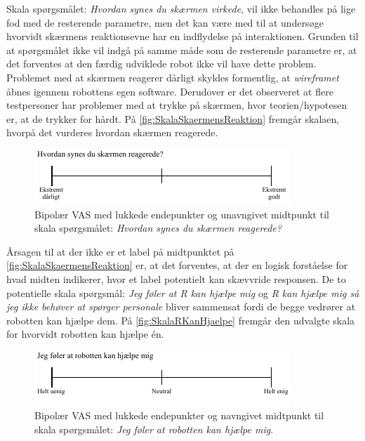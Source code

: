 Skala spørgsmålet: \textit{Hvordan synes du skærmen virkede}, vil ikke behandles på lige fod med de resterende parametre, men det kan være med til at undersøge hvorvidt skærmens reaktionsevne har en indflydelse på interaktionen. Grunden til at spørgsmålet ikke vil indgå på samme måde som de resterende parametre er, at det forventes at den færdig udviklede robot ikke vil have dette problem. Problemet med at skærmen reagerer dårligt skyldes formentlig, at \textit{wireframet} åbnes igennem robottens egen software. Derudover er det observeret at flere testpersoner har problemer med at trykke på skærmen, hvor teorien/hypotesen er, at de trykker for hårdt. På \autoref{fig:SkalaSkaermensReaktion} fremgår skalaen, hvorpå det vurderes hvordan skærmen reagerede.  
%
\begin{figure}[H]
\centering
\includegraphics[width =\textwidth]{Figure/UdvalgteSkalaer/SkaermensReaktion} 
\caption{Bipolær VAS med lukkede endepunkter og unavngivet midtpunkt til skala spørgsmålet: \textit{Hvordan synes du skærmen reagerede?}}
\label{fig:SkalaSkaermensReaktion}
\end{figure}
\noindent
%
Årsagen til at der ikke er et label på midtpunktet på \autoref{fig:SkalaSkaermensReaktion} er, at det forventes, at der en logisk forståelse for hvad midten indikerer, hvor et label potentielt kan skævvride responsen. De to potentielle skala spørgsmål: \textit{Jeg føler at R kan hjælpe mig} og \textit{R kan hjælpe mig så jeg ikke behøver at spørger personale} bliver sammensat fordi de begge vedrører at robotten kan hjælpe dem. På \autoref{fig:SkalaRKanHjaelpe} fremgår den udvalgte skala for hvorvidt robotten kan hjælpe én.
%
\begin{figure}[H]
\centering
\includegraphics[width =\textwidth]{Figure/UdvalgteSkalaer/RobottenKanHjaelpe} 
\caption{Bipolær VAS med lukkede endepunkter og navngivet midtpunkt til skala spørgsmålet: \textit{Jeg føler at robotten kan hjælpe mig}.}
\label{fig:SkalaRKanHjaelpe}
\end{figure}
